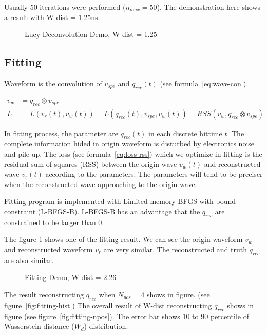 Usually 50 iterations were performed ($n_{max}=50$). The demonstration here shows a result with W-dist = 1.25ns. 

\begin{figure}[H]
    \centering
    \scalebox{0.4}{}
    \caption{Lucy Deconvolution Demo, W-dist = 1.25}
\end{figure}

\subsection{Fitting}

Waveform is the convolution of $v_{spe}$ and $q_{rec}(t)$ (see formula~\eqref{eq:wave-con}). 

\begin{align}
    v_{w} &= q_{rec} \otimes v_{spe} \label{eq:wave-con} \\
    L &= L(v_{r}(t), v_{w}(t)) = L(q_{rec}(t), v_{spe}, v_{w}(t)) = RSS(v_{w}, q_{rec} \otimes v_{spe}) \label{eq:loss-rss}
\end{align}

In fitting process, the parameter are $q_{rec}(t)$ in each discrete hittime $t$. The complete information hided in origin waveform is disturbed by electronics noise and pile-up. The loss (see formula~\ref{eq:loss-rss}) which we optimize in fitting is the residual sum of squares (RSS) between the origin wave $v_{w}(t)$ and reconstructed wave $v_{r}(t)$ according to the parameters. The parameters will tend to be preciser when the reconstructed wave approaching to the origin wave. 

Fitting program is implemented with Limited-memory BFGS with bound constraint\cite{byrd_limited_1995} (L-BFGS-B). L-BFGS-B has an advantage that the $q_{rec}$ are constrained to be larger than 0. 

The figure \ref{fig:fitting} shows one of the fitting result. We can see the origin waveform $v_{w}$ and reconstructed waveform $v_{r}$ are very similar. The reconstructed and truth $q_{rec}$ are also similar. 

\begin{figure}[H]
    \centering
    \scalebox{0.4}{}
    \caption{\label{fig:fitting} Fitting Demo, W-dist = 2.26}
\end{figure}

The result reconstructing $q_{rec}$ when $N_{pos}=4$ shows in figure. (see figure~\ref{fig:fitting-hist}) The overall result of W-dist reconstructing $q_{rec}$ shows in figure (see figure~\ref{fig:fitting-npos}). The error bar shows 10 to 90 percentile of Wasserstein distance ($W_{d}$) distribution. 

